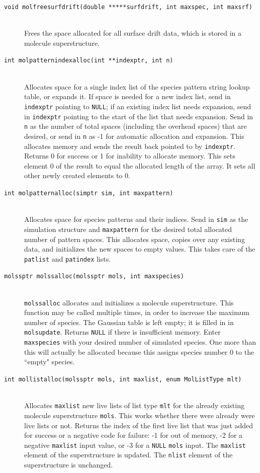 \documentclass {scrbook}
\newcommand {\ttt} {\texttt}
\begin{document}
\begin{description}
\item[\ttt{void molfreesurfdrift(double *****surfdrift, int maxspec, int maxsrf)}]
\hfill \\
Frees the space allocated for all surface drift data, which is stored in a molecule superstructure.

\item[\ttt{int molpatternindexalloc(int **indexptr, int n)}]
\hfill \\
Allocates space for a single index list of the species pattern string lookup table, or expands it. If space is needed for a new index list, send in \ttt{indexptr} pointing to \ttt{NULL}; if an existing index list needs expansion, send in \ttt{indexptr} pointing to the start of the list that needs expansion. Send in \ttt{n} as the number of total spaces (including the overhead spaces) that are desired, or send in \ttt{n} as -1 for automatic allocation and expansion. This allocates memory and sends the result back pointed to by \ttt{indexptr}. Returns 0 for success or 1 for inability to allocate memory. This sets element 0 of the result to equal the allocated length of the array. It sets all other newly created elements to 0.

\item[\ttt{int molpatternalloc(simptr sim, int maxpattern)}]
\hfill \\
Allocates space for species patterns and their indices. Send in \ttt{sim} as the simulation structure and \ttt{maxpattern} for the desired total allocated number of pattern spaces. This allocates space, copies over any existing data, and initializes the new spaces to empty values. This takes care of the \ttt{patlist} and \ttt{patindex} lists.

\item[\ttt{molssptr molssalloc(molssptr mols, int maxspecies)}]
\hfill \\
\ttt{molssalloc} allocates and initializes a molecule superstructure. This function may be called multiple times, in order to increase the maximum number of species. The Gaussian table is left empty; it is filled in in \ttt{molsupdate}. Returns \ttt{NULL} if there is insufficient memory. Enter \ttt{maxspecies} with your desired number of simulated species. One more than this will actually be allocated because this assigns species number 0 to the ``empty" species.

\item[\ttt{int mollistalloc(molssptr mols, int maxlist, enum MolListType mlt)}]
\hfill \\
Allocates \ttt{maxlist} new live lists of list type \ttt{mlt} for the already existing molecule superstructure \ttt{mols}. This works whether there were already were live lists or not. Returns the index of the first live list that was just added for success or a negative code for failure: -1 for out of memory, -2 for a negative \ttt{maxlist} input value, or -3 for a \ttt{NULL} \ttt{mols} input. The \ttt{maxlist} element of the superstructure is updated. The \ttt{nlist} element of the superstructure is unchanged.


\end{description}
\end{document}
